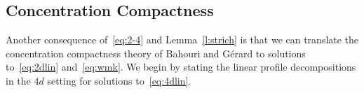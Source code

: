 \documentclass[10pt,reqno]{amsart}
\newcommand{\HH}{\mathcal{H}}
\newcommand{\R}{\mathbb{R}}
\newcommand{\EQ}[1]{\begin{equation}\begin{split} #1 \end{split}\end{equation}}
\numberwithin{equation}{section}
\newtheorem{cor}[thm]{Corollary}
\theoremstyle{remark}
\newcommand{\0}{\emptyset}
\begin{document}
%
%
 
 
 \subsection{Concentration Compactness} \label{s:cc} 
Another consequence of~\eqref{eq:2-4} and Lemma~\ref{l:strich} is that we can translate the concentration compactness theory of Bahouri and G\'erard to solutions to~\eqref{eq:2dlin} and~\eqref{eq:wmk}. 
We begin by stating the linear profile decompositions in the $4d$ setting for solutions to~\eqref{eq:4dlin}. 

\end{document}
